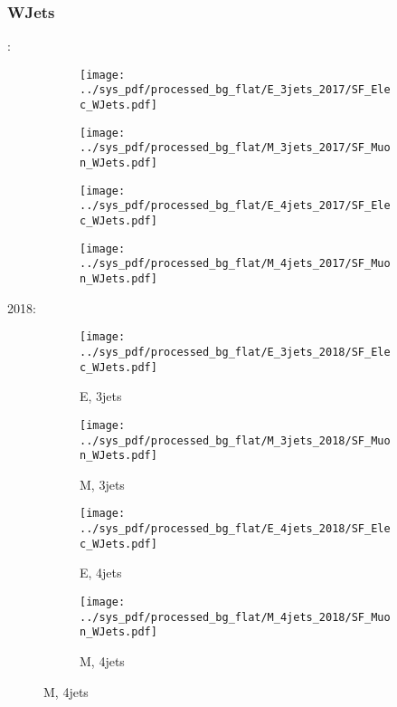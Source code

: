 \documentclass{beamer}
\begin{document}
\begin{frame}
\frametitle{WJets}
\fontsize{5}{1}:
\begin{figure}
\centering
\begin{subfigure}[b]{0.24\textwidth}
\texttt{[image: ../sys\_pdf/processed\_bg\_flat/E\_3jets\_2017/SF\_Elec\_WJets.pdf]}
\end{subfigure}
\begin{subfigure}[b]{0.24\textwidth}
\texttt{[image: ../sys\_pdf/processed\_bg\_flat/M\_3jets\_2017/SF\_Muon\_WJets.pdf]}
\end{subfigure}
\begin{subfigure}[b]{0.24\textwidth}
\texttt{[image: ../sys\_pdf/processed\_bg\_flat/E\_4jets\_2017/SF\_Elec\_WJets.pdf]}
\end{subfigure}
\begin{subfigure}[b]{0.24\textwidth}
\texttt{[image: ../sys\_pdf/processed\_bg\_flat/M\_4jets\_2017/SF\_Muon\_WJets.pdf]}
\end{subfigure}
\end{figure}
2018:
\begin{figure}
\centering
\begin{subfigure}[b]{0.24\textwidth}
\texttt{[image: ../sys\_pdf/processed\_bg\_flat/E\_3jets\_2018/SF\_Elec\_WJets.pdf]}
\captionsetup{font=tiny}
\caption{E, 3jets}
\end{subfigure}
\begin{subfigure}[b]{0.24\textwidth}
\texttt{[image: ../sys\_pdf/processed\_bg\_flat/M\_3jets\_2018/SF\_Muon\_WJets.pdf]}
\captionsetup{font=tiny}
\caption{M, 3jets}
\end{subfigure}
\begin{subfigure}[b]{0.24\textwidth}
\texttt{[image: ../sys\_pdf/processed\_bg\_flat/E\_4jets\_2018/SF\_Elec\_WJets.pdf]}
\captionsetup{font=tiny}
\caption{E, 4jets}
\end{subfigure}
\begin{subfigure}[b]{0.24\textwidth}
\texttt{[image: ../sys\_pdf/processed\_bg\_flat/M\_4jets\_2018/SF\_Muon\_WJets.pdf]}
\captionsetup{font=tiny}
\caption{M, 4jets}
\end{subfigure}
\end{figure}
\end{frame}
\end{document}
